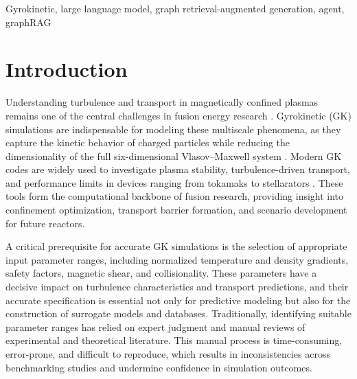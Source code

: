 \documentclass[journal]{IEEEtran}
\begin{document}
\begin{abstract}
Accurate parameter selection is fundamental to gyrokinetic plasma simulations, yet current practices rely heavily on manual literature reviews, leading to inefficiencies and inconsistencies. We introduce Plasma GraphRAG, a novel framework that integrates Graph Retrieval-Augmented Generation (GraphRAG) with large language models (LLMs) for automated, physics-grounded parameter range identification. By constructing a domain-specific knowledge graph from curated plasma literature and enabling structured retrieval over graph-anchored entities and relations, Plasma GraphRAG enables LLMs to generate accurate, context-aware recommendations. Extensive evaluations across five metrics, comprehensiveness, diversity, grounding, hallucination, and empowerment, demonstrate that Plasma GraphRAG outperforms vanilla RAG by over $10\%$ in overall quality and reduces hallucination rates by up to $25\%$. {Beyond enhancing simulation reliability, Plasma GraphRAG offers a methodology for accelerating scientific discovery across complex, data-rich domains.}
\end{abstract}

\begin{IEEEkeywords}
Gyrokinetic, large language model, graph retrieval-augmented generation, agent, graphRAG
\end{IEEEkeywords}

\section{Introduction}

Understanding turbulence and transport in magnetically confined plasmas remains one of the central challenges in fusion energy research \cite{candy2004local}. Gyrokinetic (GK) simulations are indispensable for modeling these multiscale phenomena, as they capture the kinetic behavior of charged particles while reducing the dimensionality of the full six-dimensional Vlasov--Maxwell system \cite{lee1987gyrokinetic}. {Modern GK codes are widely used to investigate plasma stability, turbulence-driven transport, and performance limits in devices ranging from tokamaks to stellarators \cite{garbet2010gyrokinetic}.} These tools form the computational backbone of fusion research, providing insight into confinement optimization, transport barrier formation, and scenario development for future reactors.

A critical prerequisite for accurate GK simulations is the {selection of appropriate input parameter ranges}, including normalized temperature and density gradients, safety factors, magnetic shear, and collisionality. These parameters have a decisive impact on turbulence characteristics and transport predictions, and their accurate specification is essential not only for predictive modeling but also for the construction of surrogate models and databases. Traditionally, identifying suitable parameter ranges has relied on expert judgment and manual reviews of experimental and theoretical literature. This manual process is time-consuming, error-prone, and difficult to reproduce, {which results in} inconsistencies across benchmarking studies and undermine confidence in simulation outcomes.
\end{document}
